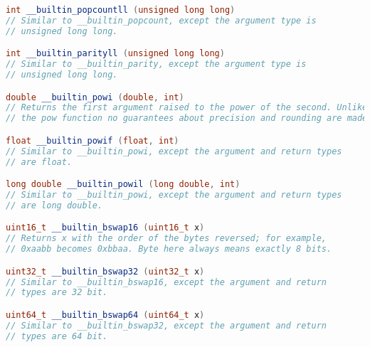 \documentclass[12pt,a4paper,twoside]{report}
\begin{document}
\begin{lstlisting}[caption=Builtins,language=C++]
int __builtin_popcountll (unsigned long long)
// Similar to __builtin_popcount, except the argument type is 
// unsigned long long.

int __builtin_parityll (unsigned long long)
// Similar to __builtin_parity, except the argument type is 
// unsigned long long.

double __builtin_powi (double, int)
// Returns the first argument raised to the power of the second. Unlike 
// the pow function no guarantees about precision and rounding are made.

float __builtin_powif (float, int)
// Similar to __builtin_powi, except the argument and return types
// are float.

long double __builtin_powil (long double, int)
// Similar to __builtin_powi, except the argument and return types 
// are long double.

uint16_t __builtin_bswap16 (uint16_t x)
// Returns x with the order of the bytes reversed; for example, 
// 0xaabb becomes 0xbbaa. Byte here always means exactly 8 bits.

uint32_t __builtin_bswap32 (uint32_t x)
// Similar to __builtin_bswap16, except the argument and return 
// types are 32 bit.

uint64_t __builtin_bswap64 (uint64_t x)
// Similar to __builtin_bswap32, except the argument and return 
// types are 64 bit.
\end{lstlisting}
\end{document}
